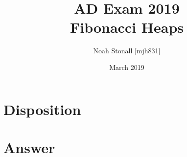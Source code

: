 \documentclass{article}
\title{AD Exam 2019 \\ Fibonacci Heaps}
\author{Noah Stonall [mjh831]}
\date{March 2019}
\begin{document}
\maketitle

\section*{Disposition}


\section*{Answer}

\end{document}
